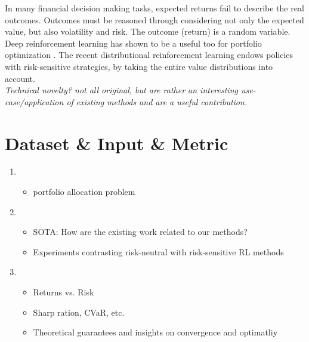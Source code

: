 In many financial decision making tasks, expected returns fail to describe the real outcomes. Outcomes must be
reasoned through considering not only the expected value, but also volatility and risk. The outcome (return) is a random variable.\\

Deep reinforcement learning has shown to be a useful too for portfolio optimization \citep{zhang_deep_2020}. The recent distributional reinforcement learning \citep{bellemare_distributional_2017, dabney_distributional_2018} endows policies with risk-sensitive strategies, by taking the entire value distributions into account.\\

\textit{Technical novelty? not all original, but are rather an interesting use-case/application of existing methods and are a useful contribution.}
\section{Dataset \& Input \& Metric}
\begin{enumerate}
\item
	\begin{itemize}
	\item
	portfolio allocation problem
	\end{itemize}

\item
	\begin{itemize}
	\item
	SOTA: How are the existing work related to our methods? 
	\item
	Experiments contrasting risk-neutral with risk-sensitive RL methods
	\end{itemize}
\item
	\begin{itemize}
	\item
	Returns vs. Risk
	\item
	Sharp ration, CVaR, etc.
	\item
	Theoretical guarantees and insights on convergence and optimatliy
	\end{itemize}
\end{enumerate}

